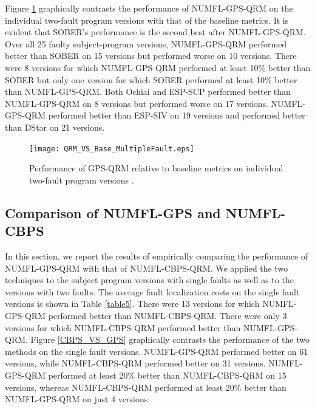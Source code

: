 \documentclass[times]{stvrauth}
\begin{document}
Figure \ref{QRM_VS_Base_MultipleFault} graphically contrasts the performance of NUMFL-GPS-QRM on the individual two-fault program versions with that of the baseline metrics.  It is evident that SOBER's performance is the second best after NUMFL-GPS-QRM.  Over all 25 faulty subject-program versions, NUMFL-GPS-QRM performed better than SOBER on 15 versions but performed worse on 10 versions.  There were 8 versions for which NUMFL-GPS-QRM performed at least 10\% better than SOBER but only one version for which SOBER performed at least 10\% better than NUMFL-GPS-QRM.  Both Ochiai and ESP-SCP performed better than NUMFL-GPS-QRM on 8 versions but performed worse on 17 versions.  NUMFL-GPS-QRM performed better than ESP-SIV on 19 versions and performed better than DStar on 21 versions.
\begin{figure}[!thpb]
\centering
\texttt{[image: QRM\_VS\_Base\_MultipleFault.eps]}
\caption{Performance of GPS-QRM relative to baseline metrics on individual two-fault program versions .}
\label{QRM_VS_Base_MultipleFault}
\end{figure}

\subsection{Comparison of NUMFL-GPS and NUMFL-CBPS}
In this section, we report the results of empirically comparing the performance of NUMFL-GPS-QRM with that of NUMFL-CBPS-QRM.  We applied the two techniques to the subject program versions with single faults as well as to the versions with two faults.  The average fault localization costs on the single fault versions is shown in Table \ref{table5}.  There were 13 versions for which NUMFL-GPS-QRM performed better than NUMFL-CBPS-QRM. There were only 3 versions for which NUMFL-CBPS-QRM performed better than NUMFL-GPS-QRM. Figure \ref{CBPS_VS_GPS} graphically contrasts the performance of the two methods on the single fault versions.  NUMFL-GPS-QRM performed better on 61 versions, while NUMFL-CBPS-QRM performed better on 31 versions.  NUMFL-GPS-QRM performed at least 20\% better than NUMFL-CBPS-QRM on 15 versions, whereas NUMFL-CBPS-QRM performed at least 20\% better than NUMFL-GPS-QRM on just 4 versions.
\end{document}
